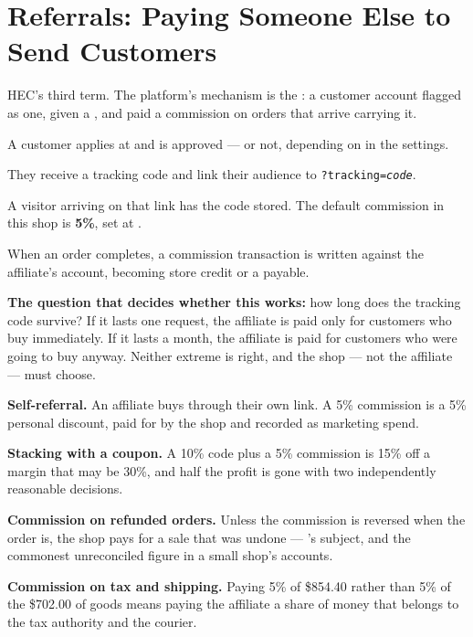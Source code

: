\section{Referrals: Paying Someone Else to Send Customers}

HEC's third term. The platform's mechanism is the : a customer
account flagged as one, given a , and paid a commission on
orders that arrive carrying it.

\begin{examplebox}
\begin{tightnum}
  \item A customer applies at  and is approved
        --- or not, depending on  in the settings.
  \item They receive a tracking code and link their audience to
        \texttt{?tracking=\textit{code}}.
  \item A visitor arriving on that link has the code stored. The default
        commission in this shop is \textbf{5\%}, set at
        .
  \item When an order completes, a commission transaction is written against
        the affiliate's account, becoming store credit or a payable.
\end{tightnum}

\smallskip
\textbf{The question that decides whether this works:} how long does the
tracking code survive? If it lasts one request, the affiliate is paid only for
customers who buy immediately. If it lasts a month, the affiliate is paid for
customers who were going to buy anyway. Neither extreme is right, and the shop
--- not the affiliate --- must choose.
\end{examplebox}

\begin{alertbox}
\begin{tight}
  \item \textbf{Self-referral.} An affiliate buys through their own link. A 5\%
        commission is a 5\% personal discount, paid for by the shop and
        recorded as marketing spend.
  \item \textbf{Stacking with a coupon.} A 10\% code plus a 5\% commission is
        15\% off a margin that may be 30\%, and half the profit is gone with
        two independently reasonable decisions.
  \item \textbf{Commission on refunded orders.} Unless the commission is
        reversed when the order is, the shop pays for a sale that was undone
        --- 's subject, and the commonest unreconciled figure in
        a small shop's accounts.
  \item \textbf{Commission on tax and shipping.} Paying 5\% of \$854.40 rather
        than 5\% of the \$702.00 of goods means paying the affiliate a share of
        money that belongs to the tax authority and the courier.
\end{tight}
\end{alertbox}

